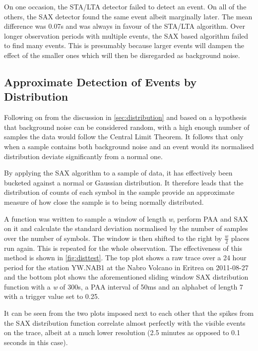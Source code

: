 \documentclass[../report.tex]{subfiles}
\begin{document}
	On one occasion, the STA/LTA detector failed to detect an event.  On all of the others, the SAX detector found the same event albeit marginally later.  The mean difference was 0.07s and was always in favour of the STA/LTA algorithm.  Over longer observation periods with multiple events, the SAX based algorithm failed to find many events.  This is presumably because larger events will dampen the effect of the smaller ones which will then be disregarded as background noise.

\subsection{Approximate Detection of Events by Distribution}

	Following on from the discussion in \cref{sec:distribution} and based on a hypothesis that background noise can be considered random, with a high enough number of samples the data would follow the Central Limit Theorem.  It follows that only when a sample contains both background noise and an event would its normalised distribution deviate significantly from a normal one.
	
	By applying the SAX algorithm to a sample of data, it has effectively been bucketed against a normal or Gaussian distribution.  It therefore leads that the distribution of counts of each symbol in the sample provide an approximate measure of how close the sample is to being normally distributed.
	
	A function was written to sample a window of length \textit{w}, perform PAA and SAX on it and calculate the standard deviation normalised by the number of samples over the number of symbols.  The window is then shifted to the right by $\frac{w}{2}$ places run again.  This is repeated for the whole observation.  The effectiveness of this method is shown in \cref{fig:disttest}.  The top plot shows a raw trace over a 24 hour period for the station YW.NAB1 at the Nabro Volcano in Eritrea on 2011-08-27 \citep{eritrea1} and the bottom plot shows the aforementioned sliding window SAX distribution function with a \textit{w} of 300s, a PAA interval of 50ms and an alphabet of length 7 with a trigger value set to 0.25.
	
	It can be seen from the two plots imposed next to each other that the spikes from the SAX distribution function correlate almost perfectly with the visible events on the trace, albeit at a much lower resolution (2.5 minutes as opposed to 0.1 seconds in this case).
	
\end{document}
